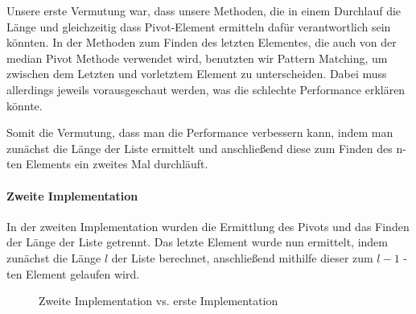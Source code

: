 Unsere erste Vermutung war, dass unsere Methoden, die in einem
Durchlauf die Länge und gleichzeitig dass Pivot-Element ermitteln dafür
verantwortlich sein könnten.
In der Methoden zum Finden des letzten Elementes, die auch von der median
Pivot Methode verwendet wird, benutzten wir Pattern Matching, um zwischen dem
Letzten und vorletztem Element zu unterscheiden.
Dabei muss allerdings jeweils vorausgeschaut werden, was die schlechte
Performance erklären könnte.

Somit die Vermutung, dass man die Performance verbessern kann, indem man
zunächst die Länge der Liste ermittelt und anschließend diese zum Finden des
n-ten Elements ein zweites Mal durchläuft.

\paragraph{Zweite Implementation}

In der zweiten Implementation wurden die Ermittlung des Pivots und das Finden
der Länge der Liste getrennt.
Das letzte Element wurde nun ermittelt, indem zunächst
die Länge \(l\) der Liste berechnet, anschließend mithilfe dieser zum
\(l-1\) -ten Element gelaufen wird.
\begin{figure}[hbt]
    \centering
    \caption{Zweite Implementation vs. erste Implementation}
    \hfill
\end{figure}


